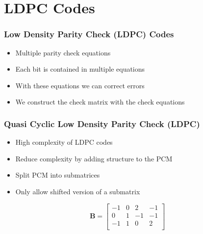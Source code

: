 \documentclass[	%
				]{beamer}
\begin{document}
\section{LDPC Codes}
\begin{frame}[fragile]
	\frametitle{Low Density Parity Check (LDPC) Codes}
	\begin{itemize}
		\item Multiple parity check equations
		\item Each bit is contained in multiple equations
		\item With these equations we can correct errors
		\item <2-> We construct the check matrix with the check equations
	\end{itemize}
\end{frame}

\begin{frame}
	\frametitle{Quasi Cyclic Low Density Parity Check (LDPC)}
	\begin{itemize}
		\item High complexity of LDPC codes
		\item Reduce complexity by adding structure to the PCM
		\item Split PCM into submatrices
		\item Only allow shifted version of a submatrix
	\end{itemize}
	\begin{equation*}
		\bm{B} = \left[\begin{matrix}
			-1 & 0 & 2 & -1\\
			0 & 1 & -1 & -1\\
			-1 & 1 & 0 & 2\\
		\end{matrix}\right]
	\end{equation*}
\end{frame}
\end{document}
